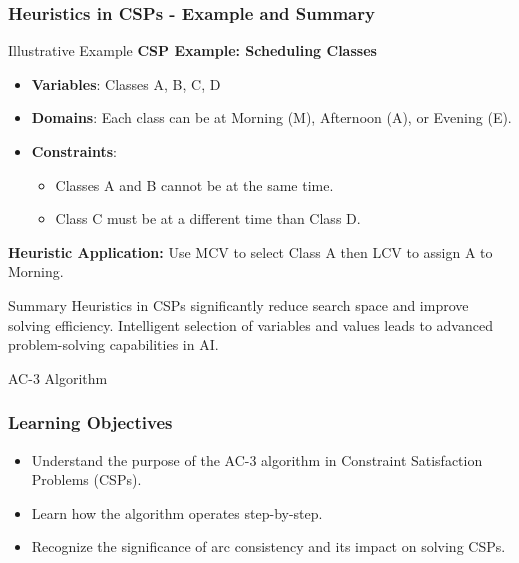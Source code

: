 \documentclass[aspectratio=169]{beamer}
\begin{document}
\begin{frame}[fragile]
    \frametitle{Heuristics in CSPs - Example and Summary}
    \begin{block}{Illustrative Example}
        \textbf{CSP Example: Scheduling Classes}
        \begin{itemize}
            \item \textbf{Variables}: Classes A, B, C, D
            \item \textbf{Domains}: Each class can be at Morning (M), Afternoon (A), or Evening (E).
            \item \textbf{Constraints}: 
                \begin{itemize}
                    \item Classes A and B cannot be at the same time.
                    \item Class C must be at a different time than Class D.
                \end{itemize}
        \end{itemize}
        \textbf{Heuristic Application:} Use MCV to select Class A then LCV to assign A to Morning.
    \end{block}

    \begin{block}{Summary}
        Heuristics in CSPs significantly reduce search space and improve solving efficiency. Intelligent selection of variables and values leads to advanced problem-solving capabilities in AI.
    \end{block}
\end{frame}

\begin{frame}{AC-3 Algorithm}
    \frametitle{Learning Objectives}
    \begin{itemize}
        \item Understand the purpose of the AC-3 algorithm in Constraint Satisfaction Problems (CSPs).
        \item Learn how the algorithm operates step-by-step.
        \item Recognize the significance of arc consistency and its impact on solving CSPs.
    \end{itemize}
\end{frame}
\end{document}
